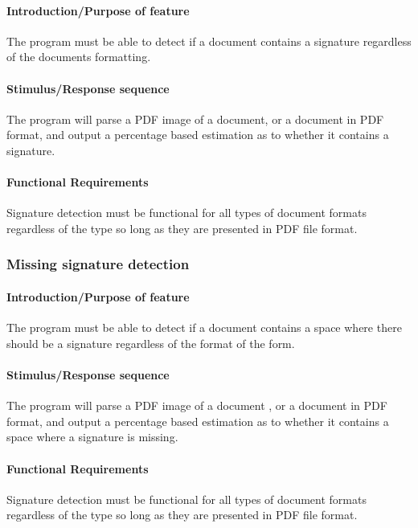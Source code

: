 \documentclass[onecolumn, draftclsnofoot,10pt, compsoc]{IEEEtran}
\begin{document}
\hfill\begin{minipage}{\dimexpr\textwidth-1cm}
\paragraph{Introduction/Purpose of feature}
The program must be able to detect if a document contains a signature regardless of the documents formatting.
\paragraph{Stimulus/Response sequence}
The program will parse a PDF image of a document, or a document in PDF format, and output a percentage based estimation as to whether it contains a signature.
\paragraph{Functional Requirements}
Signature detection must be functional for all types of document formats regardless of the type so long as they are presented in PDF file format. 
\end{minipage}
\vspace{.75cm}


\subsubsection{Missing signature detection}\vspace{.5cm}

\hfill\begin{minipage}{\dimexpr\textwidth-1cm}
\paragraph{Introduction/Purpose of feature}
The program must be able to detect if a document contains a space where there should be a signature regardless of the format of the form.
\paragraph{Stimulus/Response sequence}
The program will parse a PDF image of a document , or a document in PDF format, and output a percentage based estimation as to whether it contains a space where a signature is missing.
\paragraph{Functional Requirements}
Signature detection must be functional for all types of document formats regardless of the type so long as they are presented in PDF file format. 
\end{minipage}
\vspace{.75cm}
\end{document}
